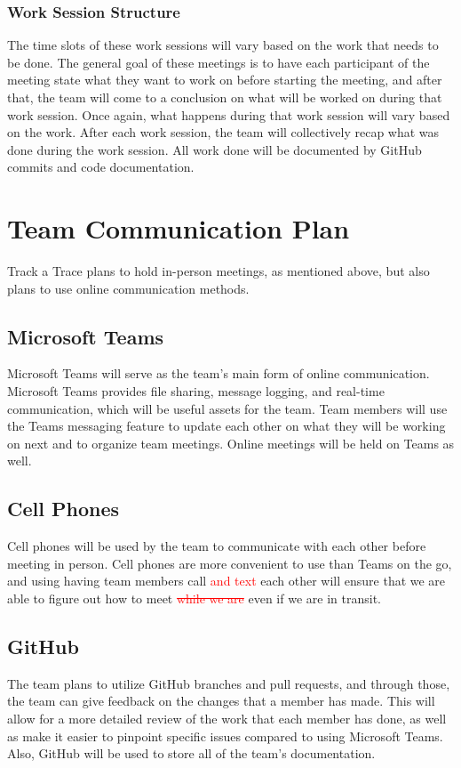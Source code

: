 \documentclass{article}
\begin{document}
\subsubsection{Work Session Structure}
The time slots of these work sessions will vary based on the work that needs to be done. The general goal of these meetings is to have each participant of the meeting state what they want to work on before starting the meeting, and after that, the team will come to a conclusion on what will be worked on during that work session. Once again, what happens during that work session will vary based on the work. After each work session, the team will collectively recap what was done during the work session. All work done will be documented by GitHub commits and code documentation.

\section{Team Communication Plan}
Track a Trace plans to hold in-person meetings, as mentioned above, but also plans to use online communication methods.

\subsection{Microsoft Teams}
Microsoft Teams will serve as the team's main form of online communication. Microsoft Teams provides file sharing, message logging, and real-time communication, which will be useful assets for the team. Team members will use the Teams messaging feature to update each other on what they will be working on next and to organize team meetings. Online meetings will be held on Teams as well.

\subsection{Cell Phones}
Cell phones will be used by the team to communicate with each other before meeting in person. Cell phones are more convenient to use than Teams on the go, and using having team members call \textcolor{red}{and text} each other will ensure that we are able to figure out how to meet \textcolor{red}{\sout{while we are}} even if we are in transit.

\subsection{GitHub}
The team plans to utilize GitHub branches and pull requests, and through those, the team can give feedback on the changes that a member has made. This will allow for a more detailed review of the work that each member has done, as well as make it easier to pinpoint specific issues compared to using Microsoft Teams. Also, GitHub will be used to store all of the team's documentation.
\end{document}

